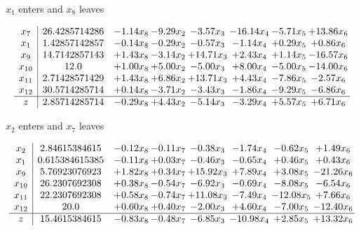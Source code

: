 \documentclass[9pt]{article}
\begin{document}
 $ x_{1} $ enters and $ x_{8} $ leaves 

 \[\begin{array}{c| c c@{\hskip 2pt} c@{\hskip 2pt} c@{\hskip 2pt} c@{\hskip 2pt} c@{\hskip 2pt} c@{\hskip 2pt} }
 x_{7}   &  26.4285714286 & -1.14 x_{8} & -9.29 x_{2} & -3.57 x_{3} & -16.14 x_{4} & -5.71 x_{5} & + 13.86 x_{6}\\
 x_{1}   &  1.42857142857 & -0.14 x_{8} & -0.29 x_{2} & -0.57 x_{3} & -1.14 x_{4} & +  0.29 x_{5} & +  0.86 x_{6}\\
 x_{9}   &  14.7142857143 & +  1.43 x_{8} & -3.14 x_{2} & + 14.71 x_{3} & +  2.43 x_{4} & +  1.14 x_{5} & -16.57 x_{6}\\
 x_{10}   &  12.0 & +  1.00 x_{8} & +  5.00 x_{2} & -5.00 x_{3} & +  8.00 x_{4} & -5.00 x_{5} & -14.00 x_{6}\\
 x_{11}   &  2.71428571429 & +  1.43 x_{8} & +  6.86 x_{2} & + 13.71 x_{3} & +  4.43 x_{4} & -7.86 x_{5} & -2.57 x_{6}\\
 x_{12}   &  30.5714285714 & +  0.14 x_{8} & -3.71 x_{2} & -3.43 x_{3} & -1.86 x_{4} & -9.29 x_{5} & -6.86 x_{6}\\
\hline
z    &  2.85714285714 & -0.29 x_{8} & +  4.43 x_{2} & -5.14 x_{3} & -3.29 x_{4} & +  5.57 x_{5} & +  6.71 x_{6}\\
\end{array}\]


 $ x_{2} $ enters and $ x_{7} $ leaves 

 \[\begin{array}{c| c c@{\hskip 2pt} c@{\hskip 2pt} c@{\hskip 2pt} c@{\hskip 2pt} c@{\hskip 2pt} c@{\hskip 2pt} }
 x_{2}   &  2.84615384615 & -0.12 x_{8} & -0.11 x_{7} & -0.38 x_{3} & -1.74 x_{4} & -0.62 x_{5} & +  1.49 x_{6}\\
 x_{1}   &  0.615384615385 & -0.11 x_{8} & +  0.03 x_{7} & -0.46 x_{3} & -0.65 x_{4} & +  0.46 x_{5} & +  0.43 x_{6}\\
 x_{9}   &  5.76923076923 & +  1.82 x_{8} & +  0.34 x_{7} & + 15.92 x_{3} & +  7.89 x_{4} & +  3.08 x_{5} & -21.26 x_{6}\\
 x_{10}   &  26.2307692308 & +  0.38 x_{8} & -0.54 x_{7} & -6.92 x_{3} & -0.69 x_{4} & -8.08 x_{5} & -6.54 x_{6}\\
 x_{11}   &  22.2307692308 & +  0.58 x_{8} & -0.74 x_{7} & + 11.08 x_{3} & -7.49 x_{4} & -12.08 x_{5} & +  7.66 x_{6}\\
 x_{12}   &  20.0 & +  0.60 x_{8} & +  0.40 x_{7} & -2.00 x_{3} & +  4.60 x_{4} & -7.00 x_{5} & -12.40 x_{6}\\
\hline
z    &  15.4615384615 & -0.83 x_{8} & -0.48 x_{7} & -6.85 x_{3} & -10.98 x_{4} & +  2.85 x_{5} & + 13.32 x_{6}\\
\end{array}\]
\end{document}
